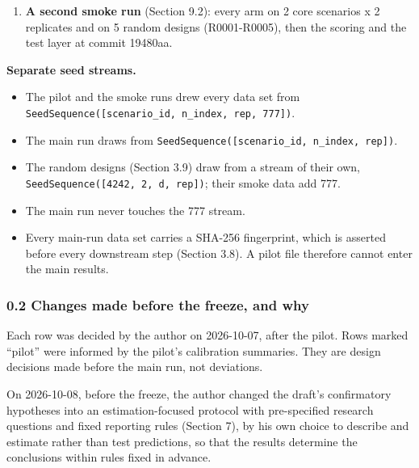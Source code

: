 \documentclass[
  10pt,
]{article}
\providecommand{\tightlist}{%
  \setlength{\itemsep}{0pt}\setlength{\parskip}{0pt}}
\begin{document}
\begin{enumerate}
  \begin{itemize}
  \tightlist
  \item
    a GPU memory and time probe of the three TFMs at 16 (n,
    p, predicted rows) cells on synthetic data, which sets
    the device rules;
  \item
    the classical arms and the test layer on 50 random
    designs (R0006-R0055), which give the per-fit costs used
    to choose D.
  \item
    Neither check computed or inspected a calibration
    summary.
  \end{itemize}
\item
  \textbf{A second smoke run} (Section 9.2): every arm on 2
  core scenarios x 2 replicates and on 5 random designs
  (R0001-R0005), then the scoring and the test layer at
  commit 19480aa.
\end{enumerate}

\textbf{Separate seed streams.}

\begin{itemize}
\tightlist
\item
  The pilot and the smoke runs drew every data set from
  \texttt{SeedSequence({[}scenario\_id,\ n\_index,\ rep,\ 777{]})}.
\item
  The main run draws from
  \texttt{SeedSequence({[}scenario\_id,\ n\_index,\ rep{]})}.
\item
  The random designs (Section 3.9) draw from a stream of
  their own,
  \texttt{SeedSequence({[}4242,\ 2,\ d,\ rep{]})}; their
  smoke data add 777.
\item
  The main run never touches the 777 stream.
\item
  Every main-run data set carries a SHA-256 fingerprint,
  which is asserted before every downstream step (Section
  3.8). A pilot file therefore cannot enter the main
  results.
\end{itemize}

\subsubsection{0.2 Changes made before the freeze, and
why}\label{changes-made-before-the-freeze-and-why}

Each row was decided by the author on 2026-10-07, after the
pilot. Rows marked ``pilot'' were informed by the pilot's
calibration summaries. They are design decisions made before
the main run, not deviations.

On 2026-10-08, before the freeze, the author changed the
draft's confirmatory hypotheses into an estimation-focused
protocol with pre-specified research questions and fixed
reporting rules (Section 7), by his own choice to describe
and estimate rather than test predictions, so that the
results determine the conclusions within rules fixed in
advance.
\end{document}
